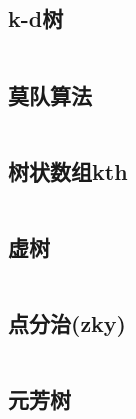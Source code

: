 \documentclass[landscape, oneside, a4paper, cs4size]{book}
\newcommand{\cppcode}[1]{
	\inputminted[mathescape,
	frame=lines,linenos]{cpp}{source/#1}
}
\begin{document}
\begin{multicols}{2}
\begin{spacing}{0.8}


\subsection{k-d树}

\cppcode{data-structure/kd-tree.cpp}



\subsection{莫队算法}

\cppcode{data-structure/mo-team.cpp}







\subsection{树状数组kth}

\cppcode{data-structure/fenwicktree.cpp}


\subsection{虚树}

\cppcode{data-structure/virtualtree.cpp}


\subsection{点分治(zky)}

\cppcode{data-structure/pointdivide.cpp}


\subsection{元芳树}

\cppcode{data-structure/yuanfang.cpp}




\end{spacing}
\end{multicols}
\end{document}
